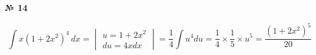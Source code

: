 \documentclass{article}
\begin{document}
\textbf{№ 14} 

\begingroup

\Large

$$ \int x (1+2x^2)^4 \,dx 
= \begin{vmatrix} u = 1+2x^2 \\ 
                 du = 4xdx \end{vmatrix}
= \frac{1}{4} \int u^4 du
= \frac{1}{4} \times \frac{1}{5} \times u^5
= \frac{(1+2x^2)^5}{20}$$

\endgroup
\end{document}
